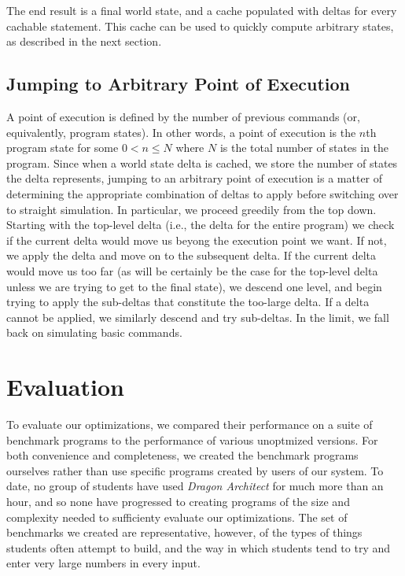 \documentclass{sig-alternate}
\newcommand{\da}{\emph{Dragon Architect}}
\begin{document}
The end result is a final world state, and a cache populated with deltas for every cachable statement. This cache can be used to quickly compute arbitrary states, as described in the next section.

\subsection{Jumping to Arbitrary Point of Execution}

A point of execution is defined by the number of previous commands (or, equivalently, program states). In other words, a point of execution is the $n$th program state for some $0<n\le N$ where $N$ is the total number of states in the program. Since when a world state delta is cached, we store the number of states the delta represents, jumping to an arbitrary point of execution is a matter of determining the appropriate combination of deltas to apply before switching over to straight simulation. In particular, we proceed greedily from the top down. Starting with the top-level delta (i.e., the delta for the entire program) we check if the current delta would move us beyong the execution point we want. If not, we apply the delta and move on to the subsequent delta. If the current delta would move us too far (as will be certainly be the case for the top-level delta unless we are trying to get to the final state), we descend one level, and begin trying to apply the sub-deltas that constitute the too-large delta. If a delta cannot be applied, we similarly descend and try sub-deltas. In the limit, we fall back on simulating basic commands. 

\section{Evaluation}
To evaluate our optimizations, we compared their performance on a suite of benchmark programs to the performance of various unoptmized versions. For both convenience and completeness, we created the benchmark programs ourselves rather than use specific programs created by users of our system. To date, no group of students have used \da{} for much more than an hour, and so none have progressed to creating programs of the size and complexity needed to sufficienty evaluate our optimizations. The set of benchmarks we created are representative, however, of the types of things students often attempt to build, and the way in which students tend to try and enter very large numbers in every input. 
\end{document}
